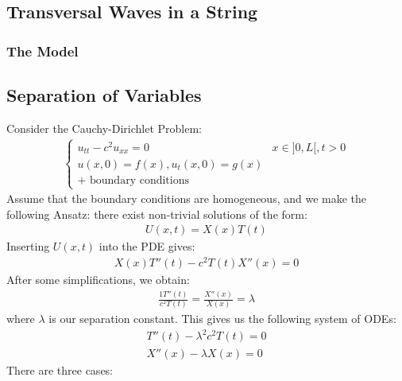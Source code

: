 \documentclass[11pt]{scrartcl}
\theoremstyle{definition}
\theoremstyle{remark}
\begin{document}
\subsection{Transversal Waves in a String}
\subsubsection{The Model}
\subsection{Separation of Variables}
Consider the Cauchy-Dirichlet Problem: 
\begin{align*}
\begin{cases}
	u_{tt} - c^2 u_{xx} = 0 & x \in ]0, L[, t > 0 \\
	u(x,0) = f(x), u_t(x,0) = g(x) \\
	+ \text{ boundary conditions} 
\end{cases}
\end{align*}
Assume that the boundary conditions are homogeneous, and we make the following Ansatz: there exist non-trivial solutions of the form:
\begin{align*}
	U(x,t) = X(x) T(t) 
\end{align*}
Inserting $U(x,t)$ into the PDE gives:
\begin{align*}
	X(x)T''(t) - c^2 T(t) X''(x) = 0 
\end{align*}
After some simplifications, we obtain: 
\begin{align*}
	\frac{1 T''(t)}{c^2 T(t)} = \frac{X''(x)}{X(x)} = \lambda
\end{align*}
where $\lambda$ is our separation constant. This gives us the following system of ODEs:
\begin{align*}
	T''(t) - \lambda^2 c^2 T(t) = 0 \\
	X''(x) - \lambda X(x) = 0 
\end{align*}
There are three cases: 
\end{document}
